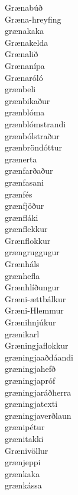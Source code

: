 \documentclass[../samsetningasafn.tex]{subfiles}
\begin{document}
\begin{bigwordlist}
\begin{footnotesize}
\begin{multicols}{4}
\begin{description}
		\item [Grænabúð]
		\item [Græna-hreyfing]
		\item [grænakaka]
		\item [Grænakelda]
		\item [Grænalið]
		\item [Grænanípa]
		\item [Grænaróló]
		\item [grænbeli]
		\item [grænbikaður]
		\item [grænblóma]
		\item [grænblómstrandi]
		\item [grænbólstraður]
		\item [grænbröndóttur]
		\item [grænerta]
		\item [grænfarðaður]
		\item [grænfasani]
		\item [grænfés]
		\item [grænfjöður]
		\item [grænfláki]
		\item [grænflekkur]
		\item [Grænflokkur]
		\item [grængruggugur]
		\item [Grænháls]
		\item [grænhefla]
		\item [Grænhlíðungur]
		\item [Græni-ættbálkur]
		\item [Græni-Hlemmur]
		\item [Grænihnjúkur]
		\item [grænikarl]
		\item [Græningjaflokkur]
		\item [græningjaaðdáandi]
		\item [græningjahefð]
		\item [græningjapróf]
		\item [græningjaráðherra]
		\item [græningjatexti]
		\item [græningjaverðlaun]
		\item [grænipétur]
		\item [grænitakki]
		\item [Grænivöllur]
		\item [grænjeppi]
		\item [grænkaka]
		\item [grænkássa]

\end{description}
\end{multicols}
\end{footnotesize}
\end{bigwordlist}
\end{document}
